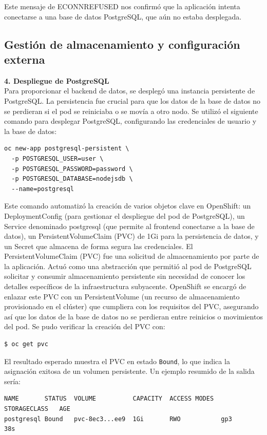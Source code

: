     Este mensaje de ECONNREFUSED nos confirmó que la aplicación intenta conectarse a una base de datos PostgreSQL, que aún no estaba desplegada. 
\newpage
    \subsection{Gestión de almacenamiento y configuración externa}
\vspace{0.5cm}
\noindent\textbf{4. Despliegue de PostgreSQL} \\
    Para proporcionar el backend de datos, se desplegó una instancia persistente de PostgreSQL. La persistencia fue crucial para que los datos de la base de datos no se perdieran si el pod se reiniciaba o se movía a otro nodo.
    Se utilizó el siguiente comando para desplegar PostgreSQL, configurando las credenciales de usuario y la base de datos:
    \begin{verbatim}
oc new-app postgresql-persistent \
  -p POSTGRESQL_USER=user \
  -p POSTGRESQL_PASSWORD=password \
  -p POSTGRESQL_DATABASE=nodejsdb \
  --name=postgresql
    \end{verbatim}

    Este comando automatizó la creación de varios objetos clave en OpenShift: un DeploymentConfig (para gestionar el despliegue del pod de PostgreSQL), un Service denominado postgresql (que permite al frontend conectarse a la base de datos), un PersistentVolumeClaim (PVC) de 1Gi para la persistencia de datos, y un Secret que almacena de forma segura las credenciales.
    El PersistentVolumeClaim (PVC) fue una solicitud de almacenamiento por parte de la aplicación. Actuó como una abstracción que permitió al pod de PostgreSQL solicitar y consumir almacenamiento persistente sin necesidad de conocer los detalles específicos de la infraestructura subyacente. OpenShift se encargó de enlazar este PVC con un PersistentVolume (un recurso de almacenamiento provisionado en el clúster) que cumpliera con los requisitos del PVC, asegurando así que los datos de la base de datos no se perdieran entre reinicios o movimientos del pod.
    Se pudo verificar la creación del PVC con:
    \begin{verbatim}
$ oc get pvc
    \end{verbatim}

    El resultado esperado muestra el PVC en estado \texttt{Bound}, lo que indica la asignación exitosa de un volumen persistente. Un ejemplo resumido de la salida sería:

    \begin{verbatim}
NAME       STATUS  VOLUME          CAPACITY  ACCESS MODES  STORAGECLASS   AGE
postgresql Bound   pvc-8ec3...ee9  1Gi       RWO           gp3            38s
    \end{verbatim}


